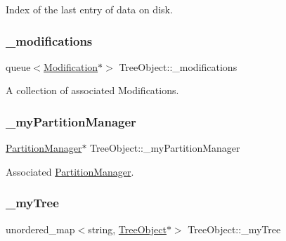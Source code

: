 Index of the last entry of data on disk. 

\mbox{\label{class_tree_object_ac285793f5d7cba8069670210606c66c7}} 
\subsubsection{\texorpdfstring{\+\_\+modifications}{\_modifications}}
{\footnotesize\ttfamily queue$<$\mbox{\hyperlink{class_modification}{Modification}}$\ast$$>$ Tree\+Object\+::\+\_\+modifications\hspace{0.3cm}{\ttfamily [protected]}}



A collection of associated Modifications. 

\mbox{\label{class_tree_object_a0b2ab130a5b95945bbd81250f667d63b}} 
\subsubsection{\texorpdfstring{\+\_\+my\+Partition\+Manager}{\_myPartitionManager}}
{\footnotesize\ttfamily \mbox{\hyperlink{class_partition_manager}{Partition\+Manager}}$\ast$ Tree\+Object\+::\+\_\+my\+Partition\+Manager\hspace{0.3cm}{\ttfamily [protected]}}



Associated \mbox{\hyperlink{class_partition_manager}{Partition\+Manager}}. 

\mbox{\label{class_tree_object_a59effca19a3475c84496c7f82c856d38}} 
\subsubsection{\texorpdfstring{\+\_\+my\+Tree}{\_myTree}}
{\footnotesize\ttfamily unordered\+\_\+map$<$string, \mbox{\hyperlink{class_tree_object}{Tree\+Object}}$\ast$$>$ Tree\+Object\+::\+\_\+my\+Tree\hspace{0.3cm}{\ttfamily [protected]}}



